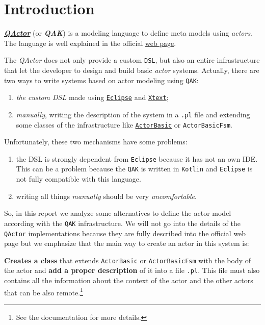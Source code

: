 \section{Introduction}

\href{http://htmlpreview.github.io/?https://github.com/anatali/issLab2021/blob/main/it.unibo.qakactor/userDocs/LabQakIntro2021.html}{\textbf{\textit{QActor}}} (or \textbf{\textit{QAK}}) is a modeling language to define meta models using \textit{actors}. The language is well explained in the official  \href{http://htmlpreview.github.io/?https://github.com/anatali/issLab2021/blob/main/it.unibo.qakactor/userDocs/LabQakIntro2021.html}{web page}.

The \textit{QActor} does not only provide a custom \texttt{DSL}, but also an entire infrastructure that let the developer to design and build basic \textit{actor} systems.
Actually, there are two ways to write systems based on actor modeling using \texttt{QAK}:
\begin{enumerate}
	\item \textit{the custom DSL} made using \href{https://www.eclipse.org/}{\texttt{Eclipse}} and \href{https://www.eclipse.org/Xtext/}{\texttt{Xtext}};
	
	\item \textit{manually}, writing the description of the system in a \texttt{.pl} file and extending some classes of the infrastructure like \href{https://htmlpreview.github.io/?https://github.com/anatali/issLab2021/blob/main/it.unibo.qakactor/userDocs/LabQakIntro2021.html\#ActorBasic}{\texttt{ActorBasic}} or \texttt{ActorBasicFsm}.
\end{enumerate}

Unfortunately, these two mechanisms have some problems:
\begin{enumerate}
	\item the DSL is strongly dependent from \texttt{Eclipse} because it has not an own IDE.
	This can be a problem because the \texttt{QAK} is written in \texttt{Kotlin} and \texttt{Eclipse} is not fully compatible with this language.
	\item writing all things \textit{manually} should be very \textit{uncomfortable}.	
\end{enumerate}

So, in this report we analyze some alternatives to define the actor model according with the \texttt{QAK} infrastructure. We will not go into the details of the \texttt{QActor} implementations because they are fully described into the official web page but we emphasize that the main way to create an actor in this system is:
\begin{center}
	\textbf{Creates a class} that extends \texttt{ActorBasic} or \texttt{ActorBasicFsm} with the body of the actor and \textbf{add a proper description} of it into a file \texttt{.pl}. This file must also contains all the information about the context of the actor and the other actors that can be also remote.\footnote{See the documentation for more details.}
\end{center}

